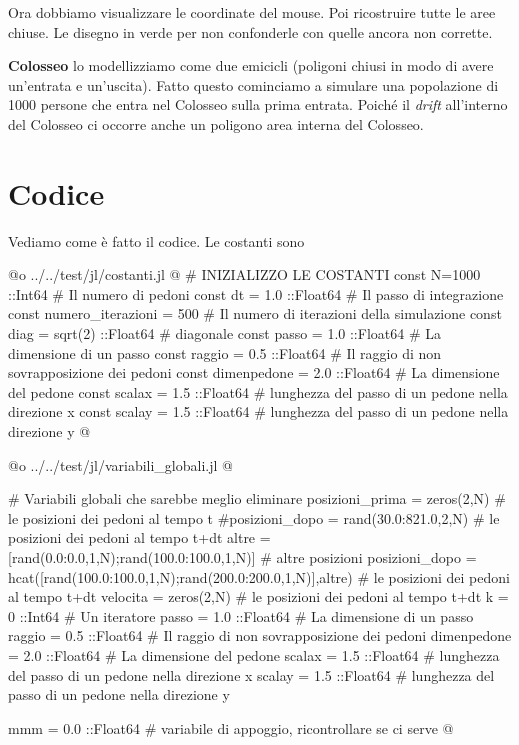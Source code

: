 \documentclass[]{article}
\begin{document}
Ora dobbiamo visualizzare le coordinate del mouse.
Poi ricostruire tutte le aree chiuse.
Le disegno in verde per non confonderle con quelle ancora non corrette.

{\bf Colosseo} lo modellizziamo come due emicicli (poligoni chiusi in modo di avere un'entrata e un'uscita).
Fatto questo cominciamo a simulare una popolazione di 1000 persone che entra nel Colosseo sulla prima entrata.
Poiché il {\sl drift} all'interno del Colosseo ci occorre anche un poligono area interna del Colosseo.
\section{Codice}
Vediamo come è fatto il codice.
Le costanti sono

@o ../../test/jl/costanti.jl @{
# INIZIALIZZO LE COSTANTI
const N=1000 ::Int64				# Il numero di pedoni
const dt = 1.0 ::Float64			# Il passo di integrazione
const numero_iterazioni = 500		# Il numero di iterazioni della simulazione
const diag = sqrt(2) ::Float64		# diagonale
const passo = 1.0 ::Float64			# La dimensione di un passo
const raggio = 0.5 ::Float64		# Il raggio di non sovrapposizione dei pedoni
const dimenpedone = 2.0 ::Float64	# La dimensione del pedone	
const scalax = 1.5 ::Float64		# lunghezza del passo di un pedone nella direzione x
const scalay = 1.5 ::Float64		# lunghezza del passo di un pedone nella direzione y
@}


@o ../../test/jl/variabili_globali.jl @{
# Variabili globali che sarebbe meglio eliminare
posizioni_prima = zeros(2,N)				# le posizioni dei pedoni al tempo t
#posizioni_dopo = rand(30.0:821.0,2,N)		# le posizioni dei pedoni al tempo t+dt
altre = [rand(0.0:0.0,1,N);rand(100.0:100.0,1,N)] # altre posizioni
posizioni_dopo = hcat([rand(100.0:100.0,1,N);rand(200.0:200.0,1,N)],altre) # le posizioni dei pedoni al tempo t+dt
velocita = zeros(2,N)						# le posizioni dei pedoni al tempo t+dt
k = 0 ::Int64								# Un iteratore
passo = 1.0 ::Float64						# La dimensione di un passo
raggio = 0.5 ::Float64						# Il raggio di non sovrapposizione dei pedoni
dimenpedone = 2.0 ::Float64						# La dimensione del pedone	
scalax = 1.5 ::Float64						# lunghezza del passo di un pedone nella direzione x
scalay = 1.5 ::Float64						# lunghezza del passo di un pedone nella direzione y

mmm = 0.0 ::Float64							# variabile di appoggio, ricontrollare se ci serve
@}
\end{document}

